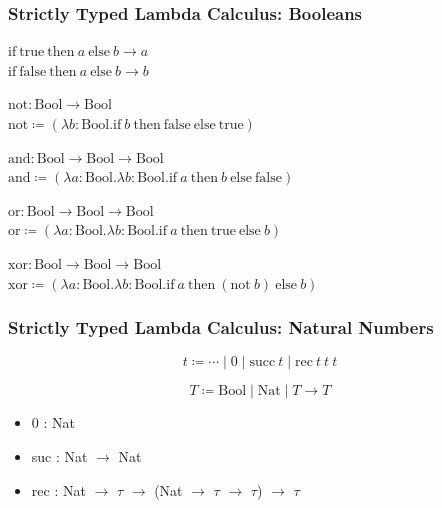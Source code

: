 \documentclass{beamer}
\newcommand{\bool}{\text{Bool}}
\newcommand{\nat}{\text{Nat}}
\newcommand{\true}{\text{true}}
\newcommand{\false}{\text{false}}
\newcommand{\suc}[1]{\text{succ}\ #1}
\newcommand{\ha}[3]{\text{if}\ #1\ \text{then}\ #2\ \text{else}\ #3}
\begin{document}
\begin{frame}[fragile]
  \frametitle{Strictly Typed Lambda Calculus: Booleans}

  $ \ha{\true}{a}{b} \rightarrow a $ \\
  $ \ha{\false}{a}{b} \rightarrow b $

  \vspace{1cm}

  \pause

  $ \text{not} : \bool \rightarrow \bool $ \\
  $ \text{not} \coloneqq (\lambda b : \bool . \ha{b}{\false}{\true}) $

  \vspace{5mm}

  $ \text{and} : \bool \rightarrow \bool \rightarrow \bool $ \\
  $ \text{and} \coloneqq (\lambda a : \bool . \lambda b : \bool . \ha{a}{b}{\false}) $ \\

  \vspace{5mm}

  $ \text{or} : \bool \rightarrow \bool \rightarrow \bool $ \\
  $ \text{or}  \coloneqq (\lambda a : \bool . \lambda b : \bool . \ha{a}{\true}{b}) $ \\

  \vspace{5mm}

  $ \text{xor} : \bool \rightarrow \bool \rightarrow \bool $ \\
  $ \text{xor} \coloneqq (\lambda a : \bool . \lambda b : \bool . \ha{a}{(\text{not}\ b)}{b}) $ \\
\end{frame}

\begin{frame}[fragile]
  \frametitle{Strictly Typed Lambda Calculus: Natural Numbers}

  $$
    t \coloneqq \cdots
      \mid \text{0}
      \mid \suc{t}
      \mid \text{rec}\ t\ t\ t
  $$

  $$ T \coloneqq \bool \mid \nat \mid T \rightarrow T $$


  \begin{itemize}
    \item[-] 0 : Nat
    \item[-] suc : Nat $\rightarrow$ Nat
    \item[-] rec : Nat $\rightarrow$ $\tau$ $\rightarrow$ (Nat $\rightarrow$ $\tau$ $\rightarrow$ $\tau$) $\rightarrow$ $\tau$
  \end{itemize}
\end{frame}
\end{document}
